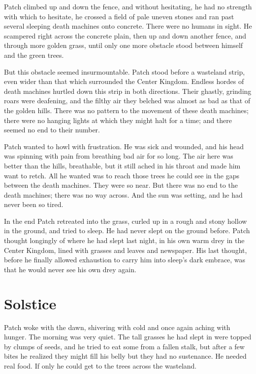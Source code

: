 \documentclass[ebook,oneside,openany,17pt]{memoir}
\newenvironment{tolerant}[1]{%
  \par\tolerance=#1\relax
}{%
  \par
}
\renewcommand{\thechapter}{\Roman{chapter}}
\newcounter{sections}
\newcommand{\sections}[1]{%
  \section*{#1}
  \addtocounter{sections}{1}%
  \pdfbookmark[1]{#1}{section.\thechapter.\thesections}}
\begin{document}
Patch climbed up and down the fence, and without hesitating, he had no
strength with which to hesitate, he crossed a field of pale uneven
stones and ran past several sleeping death machines onto
concrete. There were no humans in sight. He scampered right across the
concrete plain, then up and down another fence, and through more
golden grass, until only one more obstacle stood between himself and
the green trees.

\begin{tolerant}{1000}
But this obstacle seemed insurmountable. Patch stood before a
wasteland strip, even wider than that which surrounded the Center
Kingdom. Endless hordes of death machines hurtled down this strip in
both directions. Their ghastly, grinding roars were deafening, and the
filthy air they belched was almost as bad as that of the golden
hills. There was no pattern to the movement of these death machines;
there were no hanging lights at which they might halt for a time; and
there seemed no end to their number.
\end{tolerant}

Patch wanted to howl with frustration. He was sick and wounded, and
his head was spinning with pain from breathing bad air for so
long. The air here was better than the hills, breathable, but it still
ached in his throat and made him want to retch. All he wanted was to
reach those trees he could see in the gaps between the death
machines. They were so near. But there was no end to the death
machines; there was no way across. And the sun was setting, and he had
never been so tired.

In the end Patch retreated into the grass, curled up in a rough and
stony hollow in the ground, and tried to sleep. He had never slept on
the ground before. Patch thought longingly of where he had slept last
night, in his own warm drey in the Center Kingdom, lined with grasses
and leaves and newspaper. His last thought, before he finally allowed
exhaustion to carry him into sleep’s dark embrace, was that he would
never see his own drey again.


\sections{Solstice}

\begin{tolerant}{500}
Patch woke with the dawn, shivering with cold and once again aching
with hunger. The morning was very quiet. The tall grasses he had slept
in were topped by clumps of seeds, and he tried to eat some from a
fallen stalk, but after a few bites he realized they might fill his
belly but they had no sustenance. He needed real food. If only he
could get to the trees across the wasteland.
\end{tolerant}
\end{document}
